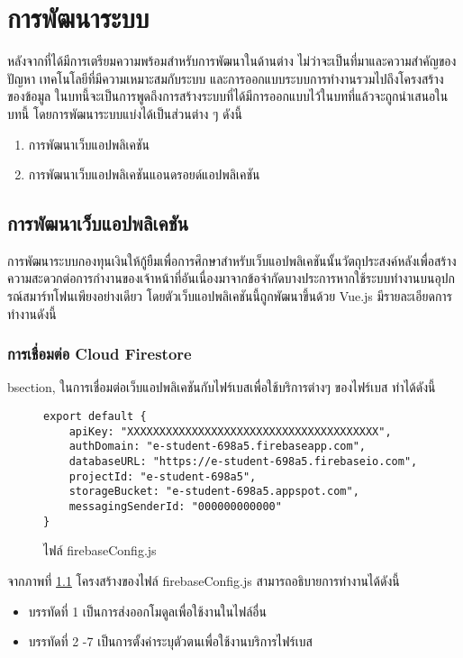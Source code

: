 \chapter{การพัฒนาระบบ}
หลังจากที่ได้มีการเตรียมความพร้อมสำหรับการพัฒนาในด้านต่าง ไม่ว่าจะเป็นที่มาและความสำคัญของปัญหา เทคโนโลยีที่มีความเหมาะสมกับระบบ และการออกแบบระบบการทำงานรวมไปถึงโครงสร้างของข้อมูล ในบทนี้จะเป็นการพูดถึงการสร้างระบบที่ได้มีการออกแบบไว้ในบทที่แล้วจะถูกนำเสนอในบทนี้ โดยการพัฒนาระบบแบ่งได้เป็นส่วนต่าง ๆ ดังนี้
	\begin{enumerate}[label=4.\arabic*]
		\item การพัฒนาเว็บแอปพลิเคชัน
		\item การพัฒนาเว็บแอปพลิเคชันแอนดรอยด์แอปพลิเคชัน
	\end{enumerate}	

\section{การพัฒนาเว็บแอปพลิเคชัน}
	การพัฒนาระบบกองทุนเงินให้กู้ยืมเพื่อการศึกษาสำหรับเว็บแอปพลิเคชันนั้นวัตถุประสงค์หลังเพื่อสร้างความสะดวกต่อการกำงานของเจ้าหน้าที่อันเนื่องมาจากข้อจำกัดบางประการหากใช้ระบบทำงานบนอุปกรณ์สมาร์ทโฟนเพียงอย่างเดียว โดยตัวเว็บแอปพลิเคชันนี้ถูกพัฒนาขึ้นด้วย Vue.js มีรายละเอียดการทำงานดังนี้
	
	\subsection{การเชื่อมต่อ Cloud Firestore}bsection,
	ในการเชื่อมต่อเว็บแอปพลิเคชันกับไฟร์เบสเพื่อใช้บริการต่างๆ ของไฟร์เบส ทำได้ดังนี้
	\begin{figure}[H]
		{\begin{lstlisting}
export default {
	apiKey: "XXXXXXXXXXXXXXXXXXXXXXXXXXXXXXXXXXXXXXX",
	authDomain: "e-student-698a5.firebaseapp.com",
	databaseURL: "https://e-student-698a5.firebaseio.com",
	projectId: "e-student-698a5",
	storageBucket: "e-student-698a5.appspot.com",
	messagingSenderId: "000000000000"
}
			\end{lstlisting}}
		\caption{ไฟล์ firebaseConfig.js}
		\label{Fig:firebaseConfig}
	\end{figure}
	จากภาพที่ \ref{Fig:firebaseConfig} โครงสร้างของไฟล์ firebaseConfig.js สามารถอธิบายการทำงานได้ดังนี้
	\begin{itemize}[label={--}]
		\item บรรทัดที่  1	     เป็นการส่งออกโมดูลเพื่อใช้งานในไฟล์อื่น
		\item บรรทัดที่  2 -7	เป็นการตั้งค่าระบุตัวตนเพื่อใช้งานบริการไฟร์เบส
	\end{itemize}
	

